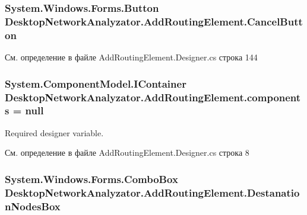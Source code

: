 \subsubsection[{\texorpdfstring{Cancel\+Button}{CancelButton}}]{\setlength{\rightskip}{0pt plus 5cm}System.\+Windows.\+Forms.\+Button Desktop\+Network\+Analyzator.\+Add\+Routing\+Element.\+Cancel\+Button\hspace{0.3cm}{\ttfamily [private]}}\hypertarget{class_desktop_network_analyzator_1_1_add_routing_element_ab4cd9dc457b2beab02d78df432a55695}{}\label{class_desktop_network_analyzator_1_1_add_routing_element_ab4cd9dc457b2beab02d78df432a55695}


См. определение в файле Add\+Routing\+Element.\+Designer.\+cs строка 144

\subsubsection[{\texorpdfstring{components}{components}}]{\setlength{\rightskip}{0pt plus 5cm}System.\+Component\+Model.\+I\+Container Desktop\+Network\+Analyzator.\+Add\+Routing\+Element.\+components = null\hspace{0.3cm}{\ttfamily [private]}}\hypertarget{class_desktop_network_analyzator_1_1_add_routing_element_a890ca22369b22d17ac5faf9ba71b98dd}{}\label{class_desktop_network_analyzator_1_1_add_routing_element_a890ca22369b22d17ac5faf9ba71b98dd}


Required designer variable. 



См. определение в файле Add\+Routing\+Element.\+Designer.\+cs строка 8

\subsubsection[{\texorpdfstring{Destanation\+Nodes\+Box}{DestanationNodesBox}}]{\setlength{\rightskip}{0pt plus 5cm}System.\+Windows.\+Forms.\+Combo\+Box Desktop\+Network\+Analyzator.\+Add\+Routing\+Element.\+Destanation\+Nodes\+Box\hspace{0.3cm}{\ttfamily [private]}}\hypertarget{class_desktop_network_analyzator_1_1_add_routing_element_aa266b6496dbd1b1c37d33eac098c3367}{}\label{class_desktop_network_analyzator_1_1_add_routing_element_aa266b6496dbd1b1c37d33eac098c3367}


